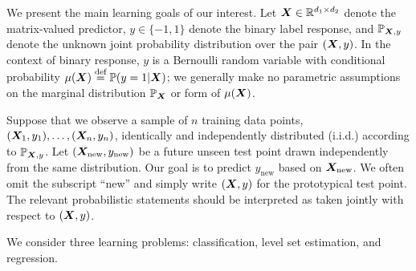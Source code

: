 \documentclass[11pt]{article}
\theoremstyle{plain}
\theoremstyle{definition}
\begin{document}
We present the main learning goals of our interest. Let $\bm X\in \mathbb{R}^{d_1\times d_2}$ denote the matrix-valued predictor, $y\in\{-1,1\}$ denote the binary label response, and $\mathbb{P}_{\bm X,y}$ denote the unknown joint probability distribution over the pair $(\bm X,y)$. In the context of binary response, $y$ is a Bernoulli random variable with conditional probability $\mu(\bm X)\stackrel{\text{def}}{=}\mathbb{P}(y=1|\bm X)$; we generally make no parametric assumptions on the marginal distribution $\mathbb{P}_{\bm X}$ or form of $\mu(\bm X)$. 


Suppose that we observe a sample of $n$ training data points, $(\bm X_1,y_1),\ldots,(\bm X_n,y_n)$, identically and independently distributed (i.i.d.) according to $\mathbb{P}_{\bm X,y}$. Let $(\bm X_{\text{new}},y_{\text{new}})$ be a future unseen test point drawn independently from the same distribution. Our goal is to predict $y_{\text{new}}$ based on $\bm X_{\text{new}}$. We often omit the subscript ``new'' and simply write $(\bm X,y)$ for the prototypical test point. The relevant probabilistic statements should be interpreted as taken jointly with respect to $(\bm X,y)$.

We consider three learning problems: classification, level set estimation, and regression. 
\end{document}
